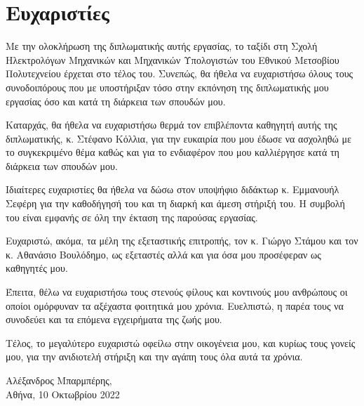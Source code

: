 \chapter*{Ευχαριστίες}

Με την ολοκλήρωση της διπλωματικής αυτής εργασίας, το ταξίδι στη Σχολή Ηλεκτρολόγων Μηχανικών και Μηχανικών Υπολογιστών του Εθνικού Μετσοβίου Πολυτεχνείου έρχεται στο τέλος του. Συνεπώς, θα ήθελα να ευχαριστήσω όλους τους συνοδοιπόρους που με υποστήριξαν τόσο στην εκπόνηση της διπλωματικής μου εργασίας όσο και κατά τη διάρκεια των σπουδών μου.\par

Καταρχάς, θα ήθελα να ευχαριστήσω θερμά τον επιβλέποντα καθηγητή αυτής της διπλωματικής, κ. Στέφανο Κόλλια, για την ευκαιρία που μου έδωσε να ασχοληθώ με το συγκεκριμένο θέμα καθώς και για το ενδιαφέρον που μου καλλιέργησε κατά τη διάρκεια των σπουδών μου.\par

Ιδιαίτερες ευχαριστίες θα ήθελα να δώσω στον υποψήφιο διδάκτωρ κ. Εμμανουήλ Σεφέρη για την καθοδήγησή του και τη διαρκή και άμεση στήριξή του. Η συμβολή του είναι εμφανής σε όλη την έκταση της παρούσας εργασίας.\par

Ευχαριστώ, ακόμα, τα μέλη της εξεταστικής επιτροπής, τον κ. Γιώργο Στάμου και τον
κ. Αθανάσιο Βουλόδημο, ως εξεταστές αλλά και για όσα μου προσέφεραν ως καθηγητές
μου.\par

Έπειτα, θέλω να ευχαριστήσω τους στενούς φίλους και κοντινούς μου ανθρώπους οι οποίοι ομόρφυναν τα αξέχαστα φοιτητικά μου χρόνια. Ευελπιστώ, η παρέα τους να συνοδεύει και τα επόμενα εγχειρήματα της ζωής μου.\par

Τέλος, το μεγαλύτερο ευχαριστώ οφείλω στην οικογένεια μου, και κυρίως τους γονείς μου, για την ανιδιοτελή στήριξη και την αγάπη τους όλα αυτά τα χρόνια.\par
\begin{flushright}
    Αλέξανδρος Μπαρμπέρης,\\
    Αθήνα, 10 Οκτωβρίου 2022
\end{flushright}